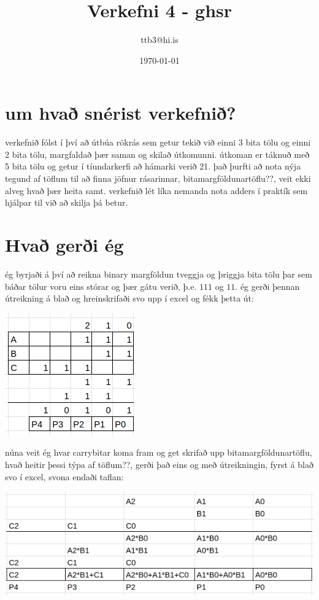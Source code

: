 \documentclass{article}
\title{Verkefni 4 - ghsr}
\author{ttb3@hi.is}
\date{\today}
\begin{document}
\maketitle


\section*{um hvað snérist verkefnið?}
verkefnið fólst í því að útbúa rökrás sem getur tekið við einni 3 bita tölu og einni 2 bita tölu, margfaldað þær saman og skilað útkomunni.
útkoman er táknuð með 5 bita tölu og getur í tíundarkerfi að hámarki verið 21. 
það þurfti að nota nýja tegund af töflum til að finna jöfnur rásarinnar, bitamargföldunartöflu??, veit ekki alveg hvað þær heita samt.
verkefnið lét líka nemanda nota adders í praktík sem hjálpar til við að skilja þá betur.

\section*{Hvað gerði ég}
ég byrjaði á því að reikna binary margföldun tveggja og þriggja bita tölu þar sem báðar tölur voru eins stórar og þær gátu verið, þ.e. $111$ og $11$.
ég gerði þennan útreikning á blað og hreinskrifaði svo upp í excel og fékk þetta út:
\begin{center}
    \includegraphics{imgs/Screenshot from 2022-03-11 10-17-35.png}
\end{center}

núna veit ég hvar carrybitar koma fram og get skrifað upp bitamargföldunartöflu, hvað heitir þessi týpa af töflum??, 
gerði það eins og með útreikningin, fyrst á blað svo í excel, svona endaði taflan:
\begin{center}
    \includegraphics[scale=0.55]{imgs/Screenshot from 2022-03-11 10-23-10.png}
\end{center}
\end{document}
